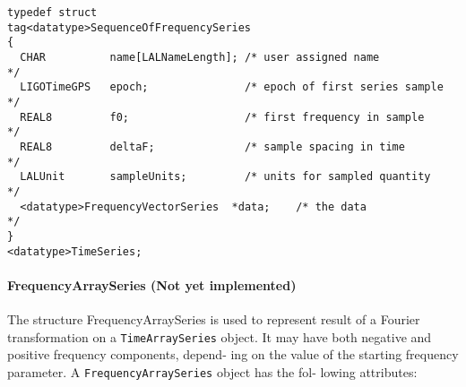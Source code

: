 \documentclass[]{ligodcc}
\renewcommand{\texttt}[1]{{\ttfamily\color{blue}#1}}
\begin{document}
{\footnotesize
\begin{verbatim}
typedef struct
tag<datatype>SequenceOfFrequencySeries
{
  CHAR          name[LALNameLength]; /* user assigned name           */
  LIGOTimeGPS   epoch;               /* epoch of first series sample */
  REAL8         f0;                  /* first frequency in sample    */
  REAL8         deltaF;              /* sample spacing in time       */
  LALUnit       sampleUnits;         /* units for sampled quantity   */
  <datatype>FrequencyVectorSeries  *data;    /* the data                     */
}
<datatype>TimeSeries;
\end{verbatim}}

\paragraph{{\texttt {FrequencyArraySeries}} {\bf (Not yet implemented)} \\}

The structure FrequencyArraySeries is used to represent result of a
Fourier transformation on a {\tt TimeArraySeries} object. It may have both
negative and positive frequency components, depend- ing on the value
of the starting frequency parameter. A {\tt FrequencyArraySeries} object has
the fol- lowing attributes:
\end{document}
